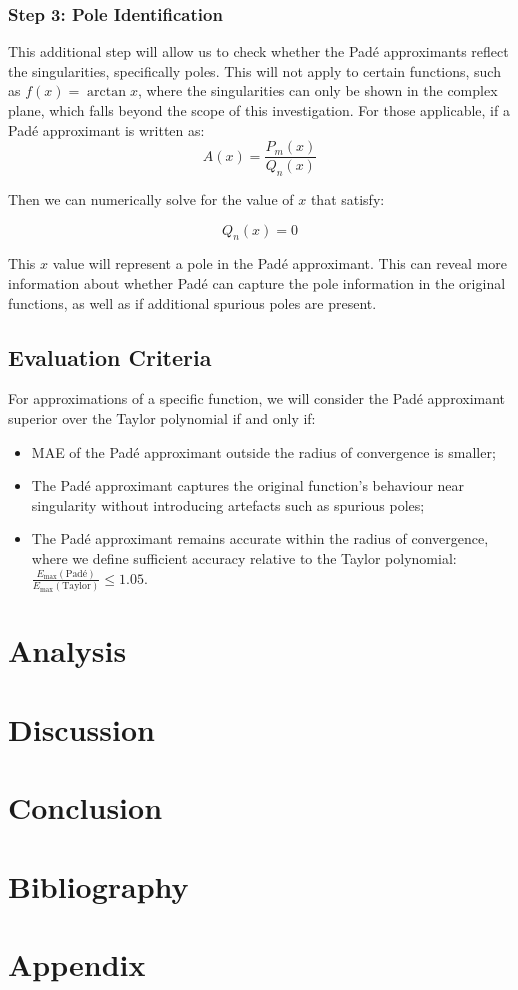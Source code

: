 \documentclass[a4paper, 12pt]{article}
\begin{document}
\subsubsection{Step 3: Pole Identification}
This additional step will allow us to check whether the Padé approximants reflect the singularities, specifically poles. This will not apply to certain functions, such as $f(x)=\arctan x$, where the singularities can only be shown in the complex plane, which falls beyond the scope of this investigation. For those applicable, if a Padé approximant is written as:
\begin{equation}
    A(x)=\frac{P_m(x)}{Q_n(x)}
\end{equation}

Then we can numerically solve for the value of $x$ that satisfy:

\begin{equation}
    Q_n(x)=0
\end{equation}

This $x$ value will represent a pole in the Padé approximant. This can reveal more information about whether Padé can capture the pole information in the original functions, as well as if additional spurious poles are present.

\subsection{Evaluation Criteria}

For approximations of a specific function, we will consider the Padé approximant superior over the Taylor polynomial if and only if:

\begin{itemize}
    \item MAE of the Padé approximant outside the radius of convergence is smaller;
    \item The Padé approximant captures the original function's behaviour near singularity without introducing artefacts such as spurious poles;
    \item The Padé approximant remains accurate within the radius of convergence, where we define sufficient accuracy relative to the Taylor polynomial: $\frac{E_{\max}(\text{Padé})}{E_{\max}(\text{Taylor})} \le 1.05
$.
\end{itemize}

\section{Analysis} 



\section{Discussion} 



\section{Conclusion} 



\section{Bibliography}



\section{Appendix}
\end{document}
